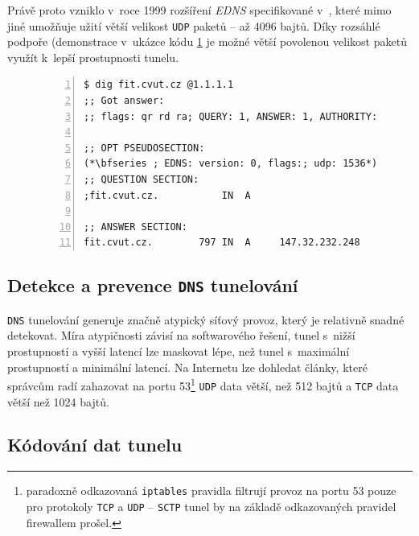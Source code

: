\documentclass[thesis=M,czech]{FITthesis}[2012/10/20]
\begin{document}
    Právě proto vzniklo v~roce 1999 rozšíření \textit{EDNS} specifikované v~\cite[RFC 6891]{rfc6891}, které mimo jiné umožňuje užití větší velikost \texttt{UDP} paketů -- až 4096 bajtů. Díky rozsáhlé podpoře (demonstrace v~ukázce kódu \ref{code:dig-dns} je možné větší povolenou velikost paketů využít k~lepší prostupnosti tunelu.
    
    
    \begin{figure}[h]
	\begin{lstlisting}[caption=Část výstupu nástroje \texttt{dig} demonstrující užití \texttt{EDNS} v~praxi (velikost \texttt{UDP} paketu 1536 bajtů od DNS serveru \texttt{1.1.1.1} (provozovatel \textit{Cloudflare} a \textit{APNIC}),frame=single,numbers=left]
$ dig fit.cvut.cz @1.1.1.1
;; Got answer:
;; flags: qr rd ra; QUERY: 1, ANSWER: 1, AUTHORITY: 0, ADDITIONAL: 1

;; OPT PSEUDOSECTION:
(*\bfseries ; EDNS: version: 0, flags:; udp: 1536*)
;; QUESTION SECTION:
;fit.cvut.cz.			IN	A

;; ANSWER SECTION:
fit.cvut.cz.		797	IN	A     147.32.232.248

      \end{lstlisting}
      \label{code:dig-dns}
    \end{figure}

    
    \subsection{Detekce a prevence \texttt{DNS} tunelování}
    
    \texttt{DNS} tunelování generuje značně atypický síťový provoz, který je relativně snadné detekovat\cite{bakalarka-detekce-tunelu}. Míra atypičnosti závisí na  softwarového řešení, tunel s~nižší prostupností a vyšší latencí lze maskovat lépe, než tunel s~maximální prostupností a minimální latencí. Na Internetu lze dohledat články, které správcům radí zahazovat na portu 53\footnote{paradoxně odkazovaná \texttt{iptables} pravidla filtrují provoz na portu 53 pouze pro protokoly \texttt{TCP} a \texttt{UDP} -- \texttt{SCTP} tunel by na základě odkazovaných pravidel firewallem prošel.} \texttt{UDP} data větší, než 512 bajtů a \texttt{TCP} data větší než 1024 bajtů\cite{dns-iptables}.
    
    
    \subsection{Kódování dat tunelu}
    \label{sec:dns-encoding}
    
\end{document}
